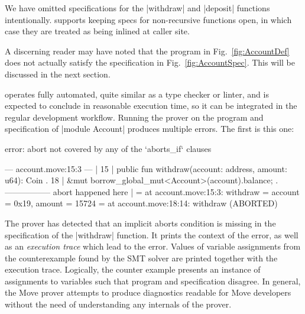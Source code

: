 We have omitted specifications for the |withdraw| and |deposit| functions
intentionally. \MVP supports keeping specs for non-recursive functions open, in
which case they are treated as being inlined at caller site.

A discerning reader may have noted that the program in Fig.~\ref{fig:AccountDef}
does not actually satisfy the specification in Fig.~\ref{fig:AccountSpec}. This
will be discussed in the next section.



\label{sec:RunningProver}

\MVP operates fully automated, quite similar as a type checker or linter, and is
expected to conclude in reasonable execution time, so it can be integrated in
the regular development workflow. Running the prover on the program and
specification of |module Account| produces multiple errors. The
first is this one:


\begin{MoveDiag}
error: abort not covered by any of the `aborts_if` clauses

    --- account.move:15:3 ---
    |
 15 |  public fun withdraw(account: address, amount: u64): Coin
    .
 18 |         &mut borrow_global_mut<Account>(account).balance;
    .              ----------------- abort happened here
    |
    =     at account.move:15:3: withdraw
    =         account = 0x19, amount = 15724
    =     at account.move:18:14: withdraw (ABORTED)
\end{MoveDiag}

\noindent The prover has detected that an implicit aborts condition is missing
in the specification of the |withdraw| function. It prints the context of the
error, as well as an \emph{execution trace} which lead to the error. Values of
variable assignments from the counterexample found by the SMT solver are printed
together with the execution trace. Logically, the counter example presents an
instance of assignments to variables such that program and specification
disagree. In general, the Move prover attempts to produce diagnostics readable
for Move developers without the need of understanding any internals of the
prover.

